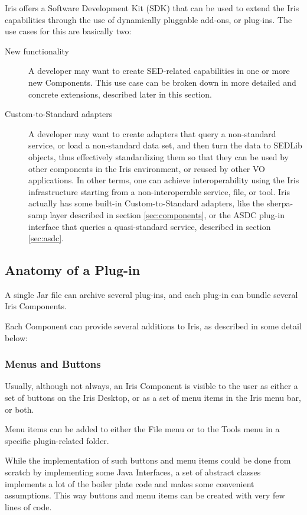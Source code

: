 \documentclass[5p]{elsarticle}
\begin{document}
Iris offers a Software Development Kit (SDK) that can be used to extend the Iris capabilities through the use of dynamically pluggable add-ons, or plug-ins.
The use cases for this are basically two:
\begin{description}
\item[New functionality] A developer may want to create SED-related capabilities in one or more new Components. This use case can be broken down in more detailed and concrete extensions, described later in this section.
\item[Custom-to-Standard adapters] A developer may want to create adapters that query a non-standard service, or load a non-standard data set, and then turn the data to SEDLib objects, thus effectively standardizing them so that they can be used by other components in the Iris environment, or reused by other VO applications. In other terms, one can achieve interoperability using the Iris infrastructure starting from a non-interoperable service, file, or tool. Iris actually has some built-in Custom-to-Standard adapters, like the sherpa-samp layer described in section \ref{sec:components}, or the ASDC plug-in interface that queries a quasi-standard service, described in section \ref{sec:asdc}.
\end{description}

\subsection{Anatomy of a Plug-in}
A single Jar file can archive several plug-ins, and each plug-in can bundle several Iris Components.

Each Component can provide several additions to Iris, as described in some detail below:

\subsubsection{Menus and Buttons}
Usually, although not always, an Iris Component is visible to the user as either a set of buttons on the Iris Desktop, or as a set of menu items in the Iris menu bar, or both.

Menu items can be added to either the File menu or to the Tools menu in a specific plugin-related folder.

While the implementation of such buttons and menu items could be done from scratch by implementing some Java Interfaces, a set of abstract classes implements a lot of the boiler plate code and makes some convenient assumptions. This way buttons and menu items can be created with very few lines of code.
\end{document}
